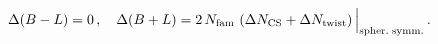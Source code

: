 \begin{equation}
\Delta(B-L) = 0\,, \quad \Delta(B+L) = 2 \, N_{\rm fam} \,
\left( \Delta N_\mathrm{CS} + \Delta N_{\rm twist}\right)\,
\Bigr|_\mathrm{spher.\; symm.}  \,.
\end{equation}

